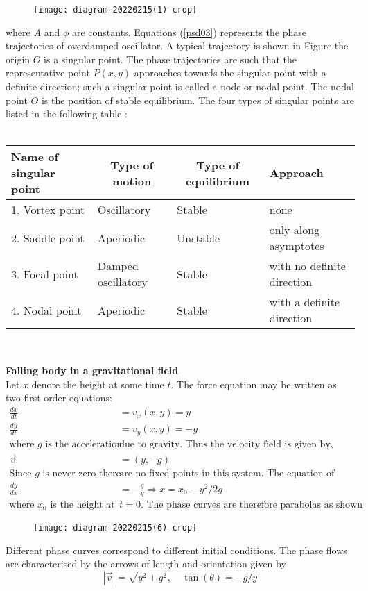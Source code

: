 \begin{figure}[H]
	\centering
	\texttt{[image: diagram-20220215(1)-crop]}
	\caption{}
	\label{}
\end{figure}
where $A$ and $\phi$ are constants. Equations (\ref{psd03}) represents the phase trajectories of overdamped oscillator. A typical trajectory is shown in Figure  the origin $O$ is a singular point. The phase trajectories are such that the representative point $P(x, y)$ approaches towards the singular point with a definite direction; such a singular point is called a node or nodal point. The nodal point $O$ is the position of stable equilibrium. The four types of singular points are listed in the following table :\\\\
\renewcommand*{\arraystretch}{1.5}
\begin{tabular}{|l|l|l|l|}
	\hline Name of singular point & \multicolumn{1}{|c|}{ Type of motion } & \multicolumn{1}{|c|}{ Type of equilibrium } & Approach \\
	\hline 1. Vortex point & Oscillatory & Stable & none \\
	\hline 2. Saddle point & Aperiodic & Unstable & only along asymptotes \\
	\hline 3. Focal point & Damped oscillatory & Stable & with no definite direction \\
	\hline 4. Nodal point & Aperiodic & Stable & with a definite direction \\
	\hline
\end{tabular}\\
\begin{example}\textbf{Falling body in a gravitational field}\\
Let $x$ denote the height at some time $t$. The force equation may be written as two first order equations:
\begin{align*}
\frac{d x}{d t}&=v_{x}(x, y)=y \\
\frac{d y}{d t}&=v_{y}(x, y)=-g\\
\text{where $g$ is the acceleration }&\text{due to gravity. Thus the velocity field is given by,}\\
\vec{v}&=(y,-g)\\
\text{Since $g$ is never zero there }&\text{are no fixed points in this system. The equation of the phase curve and its solution is	}\\
\frac{d y}{d x}&=-\frac{g}{y} \Rightarrow x=x_{0}-y^{2} / 2 g\\
\text{where $x_{0}$ is the height at }&\text{$t=0$. The phase curves are therefore parabolas as shown in the figure below.}
\end{align*}
\begin{figure}[H]
	\centering
	\texttt{[image: diagram-20220215(6)-crop]}
	\caption{}
	\label{}
\end{figure}
Different phase curves correspond to different initial conditions. The phase flows are characterised by the arrows of length and orientation given by
$$
|\vec{v}|=\sqrt{y^{2}+g^{2}}, \quad \tan (\theta)=-g / y
$$
\end{example}


